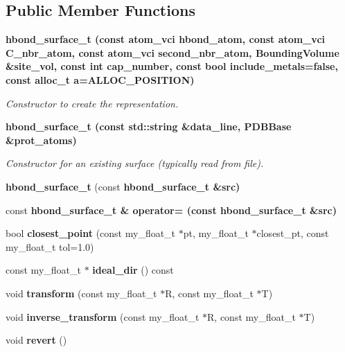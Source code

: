 \subsection*{Public Member Functions}
\begin{CompactItemize}
\item 
\bf{hbond\_\-surface\_\-t} (const atom\_\-vci hbond\_\-atom, const atom\_\-vci C\_\-nbr\_\-atom, const atom\_\-vci second\_\-nbr\_\-atom, \bf{Bounding\-Volume} \&site\_\-vol, const int cap\_\-number, const bool include\_\-metals=false, const alloc\_\-t a=ALLOC\_\-POSITION)\label{classSimSite3D_1_1hbond__surface__t_9e357e26963a25f5d34f8ead0e7154b8}

\begin{CompactList}\small\item\em Constructor to create the representation. \item\end{CompactList}\item 
\bf{hbond\_\-surface\_\-t} (const std::string \&data\_\-line, \bf{PDBBase} \&prot\_\-atoms)\label{classSimSite3D_1_1hbond__surface__t_a072af1ca67675f348af7ae0f6a9941b}

\begin{CompactList}\small\item\em Constructor for an existing surface (typically read from file). \item\end{CompactList}\item 
\textbf{hbond\_\-surface\_\-t} (const \bf{hbond\_\-surface\_\-t} \&src)\label{classSimSite3D_1_1hbond__surface__t_e1e229896cc8285447726191d4c8e5c2}

\item 
const \bf{hbond\_\-surface\_\-t} \& \textbf{operator=} (const \bf{hbond\_\-surface\_\-t} \&src)\label{classSimSite3D_1_1hbond__surface__t_c825922a0e490482d7f5362d2554beaf}

\item 
bool \textbf{closest\_\-point} (const my\_\-float\_\-t $\ast$pt, my\_\-float\_\-t $\ast$closest\_\-pt, const my\_\-float\_\-t tol=1.0)\label{classSimSite3D_1_1hbond__surface__t_828b634e714761ec0282112bab50d6f6}

\item 
const my\_\-float\_\-t $\ast$ \textbf{ideal\_\-dir} () const \label{classSimSite3D_1_1hbond__surface__t_64bcfe8ebae6a5a406fa880eabe4c0b6}

\item 
void \textbf{transform} (const my\_\-float\_\-t $\ast$R, const my\_\-float\_\-t $\ast$T)\label{classSimSite3D_1_1hbond__surface__t_81063d19a3920c08e846d70928f6c594}

\item 
void \textbf{inverse\_\-transform} (const my\_\-float\_\-t $\ast$R, const my\_\-float\_\-t $\ast$T)\label{classSimSite3D_1_1hbond__surface__t_203a7593526f7b8d8a20cb664406d6a3}

\item 
void \textbf{revert} ()\label{classSimSite3D_1_1hbond__surface__t_e65041fc31bbbaae6922364cfe78ae54}

\end{CompactItemize}
